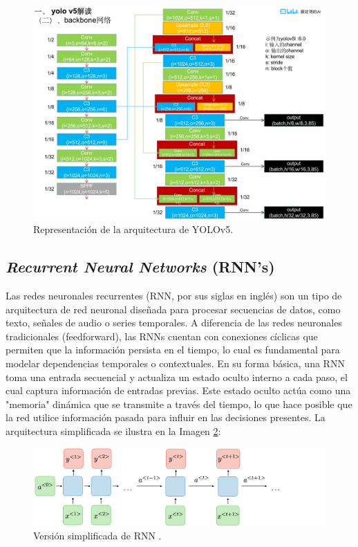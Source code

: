 \begin{figure}[h!] 
    \includegraphics[width=1\textwidth]{images/yolov5.png} 
    \centering 
    \caption{Representación de la arquitectura de YOLOv5\protect\cite{yolov5}.} 
    \label{YOLO} 
\end{figure}

\subsection{\textit{Recurrent Neural Networks} (RNN's)}

Las redes neuronales recurrentes (RNN, por sus siglas en 
inglés) son un tipo de arquitectura de red neuronal diseñada 
para procesar secuencias de datos, como texto, señales de 
audio o series temporales. A diferencia de las redes neuronales 
tradicionales (feedforward), las RNNs cuentan con conexiones 
cíclicas que permiten que la información persista en el 
tiempo, lo cual es fundamental para modelar dependencias 
temporales o contextuales. En su forma básica, una RNN 
toma una entrada secuencial y actualiza un estado oculto 
interno a cada paso, el cual captura información de entradas 
previas. Este estado oculto actúa como una "memoria" 
dinámica que se transmite a través del tiempo, lo que hace 
posible que la red utilice información pasada para influir 
en las decisiones presentes\cite{elman1990finding}. La 
arquitectura simplificada se ilustra en la Imagen \ref{image:RNN}:

\begin{figure}[h!] 
    \includegraphics[width=1\textwidth]{images/RNN.png} 
    \centering 
    \caption{Versión simplificada de RNN \protect\cite{ShervineAmidi2018}.} 
    \label{image:RNN} 
\end{figure}

